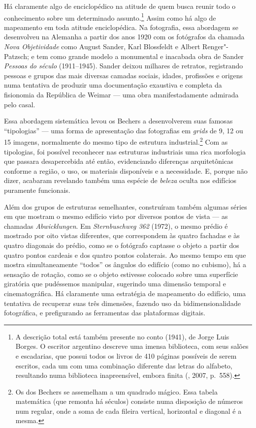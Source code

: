 Há claramente algo de enciclopédico na atitude de quem busca reunir todo
o conhecimento sobre um determinado assunto.\footnote{A descrição total
  está também presente no conto {} (1941), de
  Jorge Luis Borges. O escritor argentino descreve uma imensa
  biblioteca, com seus salões e escadarias, que possui todos os livros
  de 410 páginas possíveis de serem escritos, cada um com uma combinação
  diferente das letras do alfabeto, resultando numa biblioteca
  inapreensível, embora finita (, 2007, p.~558).} Assim como há
algo de mapeamento em toda atitude enciclopédica. Na fotografia, essa
abordagem se desenvolveu na Alemanha a partir dos anos 1920 com os
fotógrafos da chamada \emph{Nova Objetividade} como August Sander, Karl
Blossfeldt e Albert Renger"-Patzsch; e tem como grande modelo a
monumental e inacabada obra de Sander \emph{Pessoas do século} 
(1911--1945). Sander deixou milhares de retratos, registrando pessoas e
grupos das mais diversas camadas sociais, idades, profissões e origens
numa tentativa de produzir uma documentação exaustiva e completa da
fisionomia da República de Weimar --- uma obra manifestadamente admirada
pelo casal.

Essa abordagem sistemática levou os Bechers a desenvolverem suas famosas
``tipologias'' --- uma forma de apresentação das fotografias em
\emph{grids} de 9, 12 ou 15 imagens, normalmente do mesmo tipo de
estrutura industrial.\footnote{Os {} dos Bechers se assemelham a um quadrado mágico. Essa tabela matemática (que remonta há séculos) consiste numa disposição de números num {} regular, onde a soma de cada fileira vertical, horizontal e diagonal é a mesma.} Com as tipologias, foi possível reconhecer nas
estruturas industriais uma rica morfologia que passara desapercebida até
então, evidenciando diferenças arquitetônicas conforme a região, o uso,
os materiais disponíveis e a necessidade. E, porque não dizer, acabaram
revelando também uma espécie de \emph{beleza} oculta nos edifícios
puramente funcionais.

Além dos grupos de estruturas semelhantes, construíram também algumas
séries em que mostram o mesmo edifício visto por diversos pontos de
vista --- as chamadas \emph{Abwicklungen}. Em \emph{Sternbuschweg 362}
(1972), o mesmo prédio é mostrado por oito vistas diferentes, que
correspondem às quatro fachadas e às quatro diagonais do prédio, como se
o fotógrafo captasse o objeto a partir dos quatro pontos cardeais e dos
quatro pontos colaterais. Ao mesmo tempo em que mostra simultaneamente
``todos'' os ângulos do edifício (como no cubismo), há a sensação de
rotação, como se o objeto estivesse colocado sobre uma superfície
giratória que pudéssemos manipular, sugerindo uma dimensão temporal e
cinematográfica. Há claramente uma estratégia de mapeamento do edifício,
uma tentativa de recuperar suas três dimensões, fazendo uso da
bidimensionalidade fotográfica, e prefigurando as ferramentas  das
plataformas digitais.

